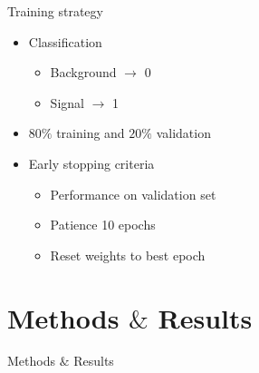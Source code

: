 \documentclass[UKenglish]{beamer}
\begin{document}
\begin{frame}{Training strategy}
    \begin{itemize}
        \item Classification
        \begin{itemize}
            \item Background $\rightarrow$ 0 
            \item Signal $\rightarrow$ 1
        \end{itemize}
        \item $80\%$ training and $20\%$ validation 
        \item Early stopping criteria
        \begin{itemize}
            \item Performance on validation set 
            \item Patience 10 epochs
            \item Reset weights to best epoch
        \end{itemize}
    \end{itemize}
\end{frame}



\section{Methods $\&$ Results}
\begin{frame}{Methods $\&$ Results}
    \tableofcontents[currentsection]
\end{frame}



\end{document}
